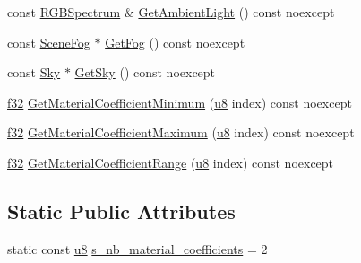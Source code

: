 \begin{DoxyCompactItemize}
\item 
const \hyperlink{structmage_1_1_r_g_b_spectrum}{R\+G\+B\+Spectrum} \& \hyperlink{structmage_1_1_pass_buffer_a91cbe609833b84c12113c9676b9de903}{Get\+Ambient\+Light} () const noexcept
\item 
const \hyperlink{structmage_1_1_scene_fog}{Scene\+Fog} $\ast$ \hyperlink{structmage_1_1_pass_buffer_a406b7dcb655d3689f0a4400edc2e9bf8}{Get\+Fog} () const noexcept
\item 
const \hyperlink{structmage_1_1_sky}{Sky} $\ast$ \hyperlink{structmage_1_1_pass_buffer_af6355cb9bd927f53bb93347348f21a11}{Get\+Sky} () const noexcept
\item 
\hyperlink{namespacemage_a6a44ad388483959dc4dff9f2aef91431}{f32} \hyperlink{structmage_1_1_pass_buffer_aaa5e6cb24f1a6b217e6ebca4920a2f05}{Get\+Material\+Coefficient\+Minimum} (\hyperlink{namespacemage_a5a362e2d56fc439362a80516ecae7828}{u8} index) const noexcept
\item 
\hyperlink{namespacemage_a6a44ad388483959dc4dff9f2aef91431}{f32} \hyperlink{structmage_1_1_pass_buffer_a774eb757831b5442154d37b473563848}{Get\+Material\+Coefficient\+Maximum} (\hyperlink{namespacemage_a5a362e2d56fc439362a80516ecae7828}{u8} index) const noexcept
\item 
\hyperlink{namespacemage_a6a44ad388483959dc4dff9f2aef91431}{f32} \hyperlink{structmage_1_1_pass_buffer_a413f445bbb3db1201705fab10305d052}{Get\+Material\+Coefficient\+Range} (\hyperlink{namespacemage_a5a362e2d56fc439362a80516ecae7828}{u8} index) const noexcept
\end{DoxyCompactItemize}
\subsection*{Static Public Attributes}
\begin{DoxyCompactItemize}
\item 
static const \hyperlink{namespacemage_a5a362e2d56fc439362a80516ecae7828}{u8} \hyperlink{structmage_1_1_pass_buffer_a453e18abdf29c4ebb08d9e002a952bf2}{s\+\_\+nb\+\_\+material\+\_\+coefficients} = 2
\end{DoxyCompactItemize}
